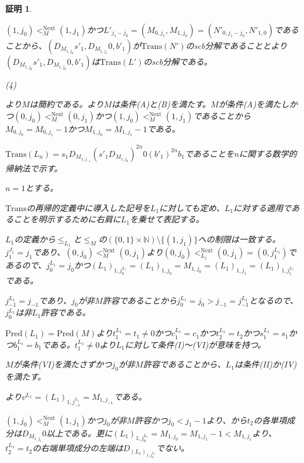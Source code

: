 \documentclass[dvipdfmx,uplatex]{jsarticle}
\theoremstyle{customnonumberbreakfortheorem}
\theoremstyle{customnonumberbreakforproof}
\newtheorem{hideableproof}{証明}
\begin{document}
\begin{hideableproof}
\begin{indented}
		\item \((1,j_0) <_M^{\textrm{Next}} (1,j_1)\)かつ\(L'_{j_1-j_0} = (M_{0,j_1},M_{1,j_0}) = (N'_{0,j_1-j_0},N'_{1,0})\)であることから、\((D_{M_{1,j_0}} s'_1,D_{M_{1,j_1}} 0,b'_1)\)が\(\textrm{Trans}(N')\)のscb分解であることとより\((D_{M_{1,j_0}} s'_1,D_{M_{1,j_0}} 0,b'_1)\)は\(\textrm{Trans}(L')\)のscb分解である。
		\item
		\item (4)
		\item {}より\(M\)は簡約である。より\(M\)は条件(A)と(B)を満たす。\(M\)が条件(A)を満たしかつ\((0,j_0) <_M^{\textrm{Next}} (0,j_1)\)かつ\((1,j_0) <_M^{\textrm{Next}} (1,j_1)\)であることから\(M_{0,j_0} = M_{0,j_1}-1\)かつ\(M_{1,j_0} = M_{1,j_1}-1\)である。
		\item \(\textrm{Trans}(L_n) = s_1 D_{M_{1,j_{-1}}} (s'_1 D_{M_{1,j_0}})^{2n} 0 (b'_1)^{2n} b_1\)であることを\(n\)に関する数学的帰納法で示す。
		\item \(n = 1\)とする。
		\begin{indented}
			\item \(\textrm{Trans}\)の再帰的定義中に導入した記号を\(L_1\)に対しても定め、\(L_1\)に対する適用であることを明示するために右肩に\(L_1\)を乗せて表記する。
			\item \(L_1\)の定義から\(\leq_{L_1}\)と\(\leq_M\)の\((\{0,1\} \times \mathbb{N}) \setminus \{(1,j_1)\}\)への制限は一致する。\(j_1^{J_1} = j_1\)であり、\((0,j_0) <_M^{\textrm{Next}} (0,j_1)\)より\((0,j_0) <_{L_1}^{\textrm{Next}} (0,j_1) = (0,j_1^{L_1})\)であるので、\(j_0^{L_1} = j_0\)かつ\((L_1)_{1,j_0^{L_1}} = (L_1)_{1,j_0} = M_{1,j_0} = (L_1)_{1,j_1} = (L_1)_{1,j_1^{L_1}}\)である。
			\item \(j_{-1}^{L_1} = j_{-1}\)であり、\(j_0\)が非\(M\)許容であることから\(j_0^{L_1} = j_0 > j_{-1} = j_{-1}^{L_1}\)となるので、\(j_0^{L_1}\)は非\(L_1\)許容である。
			\item \(\textrm{Pred}(L_1) = \textrm{Pred}(M)\)より\(t_1^{L_1} = t_1 \neq 0\)かつ\(c_1^{L_1} = c_1\)かつ\(t_2^{L_1} = t_2\)かつ\(s_1^{L_1} = s_1\)かつ\(b_1^{L_1} = b_1\)である。\(t_1^{L_1} \neq 0\)より\(L_1\)に対して条件(I)～(VI)が意味を持つ。
			\item \(M\)が条件(VI)を満たさずかつ\(j_0\)が非\(M\)許容であることから、\(L_1\)は条件(II)か(IV)を満たす。
			\item {}より\(v^{L_1} = (L_1)_{1,j_{-1}^{L_1}} = M_{1,j_{-1}}\)である。
			\item \((1,j_0) <_M^{\textrm{Next}} (1,j_1)\)かつ\(j_0\)が非\(M\)許容かつ\(j_0 < j_1-1\)より、から\(t_2\)の各単項成分は\(D_{M_{1,j_1}} 0\)以上である。更に\((L_1)_{1,j_0^{L_1}} = M_{1,j_0} = M_{1,j_1}-1 < M_{1,j_1}\)より、\(t_2^{L_1} = t_2\)の右端単項成分の左端は\(D_{(L_1)_{1,j_0^{L_1}}}\)でない。

\end{indented}
\end{indented}
\end{hideableproof}
\end{document}
